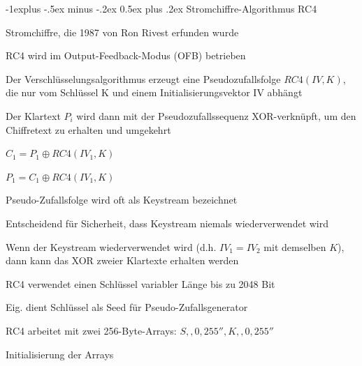 \documentclass[a4paper]{article}
\makeatletter
\renewcommand{\subsection}{\@startsection{subsection}{2}{0mm}%
 {-1explus -.5ex minus -.2ex}%
 {0.5ex plus .2ex}%
 {\normalfont\normalsize\bfseries}}
\makeatother
\begin{document}
\begin{multicols}{3}
      \subsection{Stromchiffre-Algorithmus RC4}
      \begin{itemize*}
            \item Stromchiffre, die 1987 von Ron Rivest erfunden wurde
            \item RC4 wird im Output-Feedback-Modus (OFB) betrieben
            \begin{itemize*}
                  \item Der Verschlüsselungsalgorithmus erzeugt eine Pseudozufallsfolge $RC4(IV,K)$, die nur vom Schlüssel K und einem Initialisierungsvektor IV abhängt
                  \item Der Klartext $P_i$ wird dann mit der Pseudozufallssequenz XOR-verknüpft, um den Chiffretext zu erhalten und umgekehrt
                  \item $C_1 = P_1\oplus RC4 (IV_1,K)$
                  \item $P_1 = C_1\oplus RC4 (IV_1,K)$
            \end{itemize*}
            \item Pseudo-Zufallsfolge wird oft als Keystream bezeichnet
            \item Entscheidend für Sicherheit, dass Keystream niemals wiederverwendet wird
            \item Wenn der Keystream wiederverwendet wird (d.h. $IV_1=IV_2$ mit demselben $K$), dann kann das XOR zweier Klartexte erhalten werden %
            \item RC4 verwendet einen Schlüssel variabler Länge bis zu 2048 Bit
            \item Eig. dient Schlüssel als Seed für Pseudo-Zufallsgenerator
            \item RC4 arbeitet mit zwei 256-Byte-Arrays: $S,,0,255'', K,,0,255''$
            \begin{enumerate*}
                  \item Initialisierung der Arrays

\end{enumerate*}
\end{itemize*}
\end{multicols}
\end{document}
